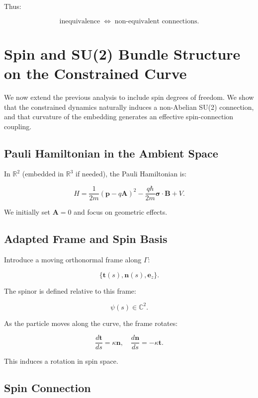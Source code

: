\documentclass[11pt]{article}
\begin{document}
Thus:

\[
\text{inequivalence} \;\Longleftrightarrow\;
\text{non-equivalent connections}.
\]


\section{Spin and SU(2) Bundle Structure on the Constrained Curve}

We now extend the previous analysis to include spin degrees of freedom. We show that the constrained dynamics naturally induces a non-Abelian SU(2) connection, and that curvature of the embedding generates an effective spin-connection coupling.

\subsection{Pauli Hamiltonian in the Ambient Space}

In $\mathbb{R}^2$ (embedded in $\mathbb{R}^3$ if needed), the Pauli Hamiltonian is:

\begin{equation}
H = \frac{1}{2m} (\mathbf{p} - q\mathbf{A})^2 
- \frac{q\hbar}{2m} \boldsymbol{\sigma} \cdot \mathbf{B} + V.
\end{equation}

We initially set $\mathbf{A}=0$ and focus on geometric effects.

\subsection{Adapted Frame and Spin Basis}

Introduce a moving orthonormal frame along $\Gamma$:

\[
\{\mathbf{t}(s), \mathbf{n}(s), \mathbf{e}_z\}.
\]

The spinor is defined relative to this frame:

\[
\psi(s) \in \mathbb{C}^2.
\]

As the particle moves along the curve, the frame rotates:

\[
\frac{d\mathbf{t}}{ds} = \kappa \mathbf{n}, \quad
\frac{d\mathbf{n}}{ds} = -\kappa \mathbf{t}.
\]

This induces a rotation in spin space.

\subsection{Spin Connection}
\end{document}
